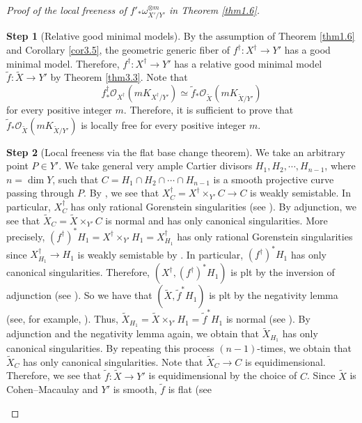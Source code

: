 \documentclass[12pt,twoside]{amsart}
\theoremstyle{definition}
\newtheorem{step}{Step}
\begin{document}
\begin{proof}[Proof of the local freeness of $f'_*\omega^{\otimes m}_{X'/Y'}$ 
in Theorem \ref{thm1.6}]
\begin{step}[Relative good minimal models]\label{step2}
By the assumption of Theorem \ref{thm1.6} and Corollary \ref{cor3.5}, 
the geometric generic fiber of $f^\dag: X^\dag\to Y'$ has a good minimal 
model. Therefore, $f^\dag: X^\dag\to Y'$ has a relative good minimal 
model $\widetilde f: \widetilde X\to Y'$ 
by Theorem \ref{thm3.3}. 
Note that 
$$
f^\dag_*\mathcal O_{X^{\dag}}(mK_{X^{\dag}/Y'})\simeq 
\widetilde f_*\mathcal O_{\widetilde X}(mK_{{\widetilde X}/Y'})
$$ 
for every positive integer $m$. 
Therefore, it is sufficient to prove 
that 
${\widetilde f}_*\mathcal O_{\widetilde X}(mK_{\widetilde {X}/Y'})$ is locally 
free for every positive integer $m$. 
\end{step}
\begin{step}[Local freeness via the 
flat base change theorem]\label{step3}
We take an arbitrary point $P\in Y'$. 
We take general very ample Cartier divisors 
$H_1, H_2, \cdots, H_{n-1}$, where $n=\dim Y$, such that 
$C=H_1\cap H_2\cap \cdots \cap H_{n-1}$ is a smooth 
projective curve passing 
through $P$. 
By \cite[Lemma 6.2]{abramovich-karu}, 
we see that $X^\dag_C=X^\dag\times _{Y'}C\to C$ is weakly 
semistable. 
In particular, $X^\dag_C$ has only rational Gorenstein singularities 
(see \cite[Lemma 6.1]{abramovich-karu}). 
By adjunction, 
we see that 
${\widetilde X}_C=\widetilde X \times _{Y'}C$ is normal and 
has only canonical singularities. 
More precisely, 
$(f^\dag)^*H_1= X^\dag\times _{Y'} H_1= X^\dag_{H_1}$ has 
only rational Gorenstein singularities since 
$X^\dag_{H_1}\to H_1$ is weakly 
semistable by \cite[Lemma 6.1 and 
Lemma 6.2]{abramovich-karu}. 
In particular, $(f^\dag)^*H_1$ has only canonical singularities. 
Therefore, 
$(X^\dag, (f^\dag)^*H_1)$ is plt by the inversion of 
adjunction (see \cite[Theorem 5.50]{kollar-mori}). 
So we have that $(\widetilde X, {\widetilde f}^*H_1)$ is 
plt by the negativity lemma (see, for example, \cite[Proposition 3.51]{kollar-mori}). 
Thus, $\widetilde X_{H_1}=\widetilde X\times _{Y'} H_1={\widetilde f}
^*H_1$ is 
normal (see \cite[Proposition 5.51]{kollar-mori}). 
By adjunction and the negativity lemma again, 
we obtain that ${\widetilde X}_{H_1}$ has only 
canonical singularities. By repeating this process $(n-1)$-times, 
we obtain that 
${\widetilde X}_C$ has only canonical singularities.  
Note that $\widetilde X_C\to C$ is equidimensional. 
Therefore, 
we see that 
$\widetilde f: \widetilde X\to Y'$ is equidimensional by the 
choice of $C$.  
Since $\widetilde X$ is Cohen--Macaulay and $Y'$ is smooth, 
$\widetilde f$ is flat (see \cite[Chapter III, Exercise 10.9]{hartshorne} 

\end{step}
\end{proof}
\end{document}
